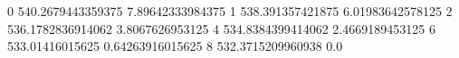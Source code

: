 0 540.2679443359375 7.89642333984375
1 538.391357421875 6.01983642578125
2 536.1782836914062 3.8067626953125
4 534.8384399414062 2.4669189453125
6 533.01416015625 0.64263916015625
8 532.3715209960938 0.0
